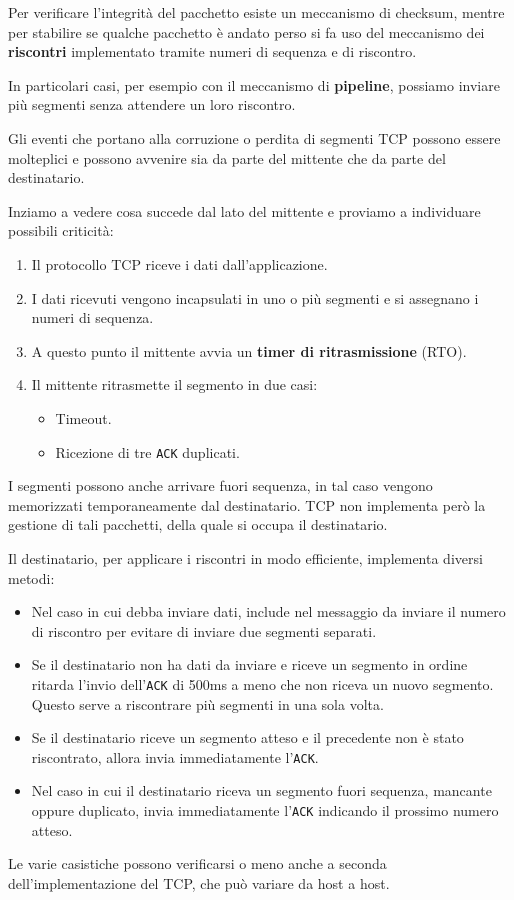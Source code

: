 Per verificare l'integrità del pacchetto esiste un meccanismo di 
checksum, mentre per stabilire se qualche pacchetto è andato perso
si fa uso del meccanismo dei \textbf{riscontri} implementato tramite
numeri di sequenza e di riscontro.

In particolari casi, per esempio con il meccanismo di 
\textbf{pipeline}, possiamo inviare più segmenti senza attendere un 
loro riscontro.

Gli eventi che portano alla corruzione o perdita di segmenti TCP 
possono essere molteplici e possono avvenire sia da parte del mittente 
che da parte del destinatario.

Inziamo a vedere cosa succede dal lato del mittente e proviamo a 
individuare possibili criticità:
\begin{enumerate}
	\item Il protocollo TCP riceve i dati dall'applicazione.
	\item I dati ricevuti vengono incapsulati in uno o più segmenti e 
		si assegnano i numeri di sequenza.
	\item A questo punto il mittente avvia un \textbf{timer di 
		ritrasmissione} (RTO).
	\item Il mittente ritrasmette il segmento in due casi:
		\begin{itemize}
			\item Timeout.
			\item Ricezione di tre \verb|ACK| duplicati.
		\end{itemize}
\end{enumerate}
I segmenti possono anche arrivare fuori sequenza, in tal caso vengono
memorizzati temporaneamente dal destinatario. TCP non implementa però
la gestione di tali pacchetti, della quale si occupa il destinatario.

Il destinatario, per applicare i riscontri in modo efficiente, 
implementa diversi metodi:
\begin{itemize}
	\item Nel caso in cui debba inviare dati, include nel messaggio 
		da inviare il numero di riscontro per evitare di inviare due 
		segmenti separati.
	\item Se il destinatario non ha dati da inviare e riceve un 
		segmento in ordine ritarda l'invio dell'\verb|ACK| di 500ms a 
		meno che non riceva un nuovo segmento. Questo serve a 
		riscontrare più segmenti in una sola volta.
	\item Se il destinatario riceve un segmento atteso e il precedente 
		non è stato riscontrato, allora invia immediatamente 
		l'\verb|ACK|.
	\item Nel caso in cui il destinatario riceva un segmento fuori 
		sequenza, mancante oppure duplicato, invia immediatamente 
		l'\verb|ACK| indicando il prossimo numero atteso.
\end{itemize}
Le varie casistiche possono verificarsi o meno anche a seconda 
dell'implementazione del TCP, che può variare da host a host.

